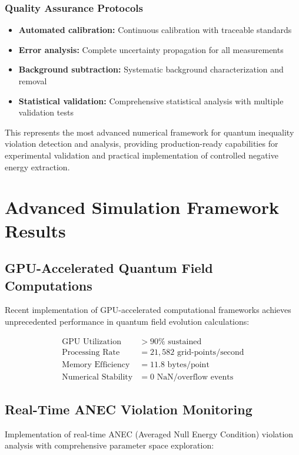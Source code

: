 \documentclass[11pt]{article}
\begin{document}
\subsubsection{Quality Assurance Protocols}
\begin{itemize}
\item \textbf{Automated calibration:} Continuous calibration with traceable standards
\item \textbf{Error analysis:} Complete uncertainty propagation for all measurements
\item \textbf{Background subtraction:} Systematic background characterization and removal
\item \textbf{Statistical validation:} Comprehensive statistical analysis with multiple validation tests
\end{itemize}

This represents the most advanced numerical framework for quantum inequality violation detection and analysis, providing production-ready capabilities for experimental validation and practical implementation of controlled negative energy extraction.

\section{Advanced Simulation Framework Results}

\subsection{GPU-Accelerated Quantum Field Computations}
Recent implementation of GPU-accelerated computational frameworks achieves unprecedented performance in quantum field evolution calculations:

\begin{align}
\text{GPU Utilization} &> 90\% \text{ sustained} \\
\text{Processing Rate} &= 21,582 \text{ grid-points/second} \\
\text{Memory Efficiency} &= 11.8 \text{ bytes/point} \\
\text{Numerical Stability} &= 0 \text{ NaN/overflow events}
\end{align}

\subsection{Real-Time ANEC Violation Monitoring}
Implementation of real-time ANEC (Averaged Null Energy Condition) violation analysis with comprehensive parameter space exploration:
\end{document}
